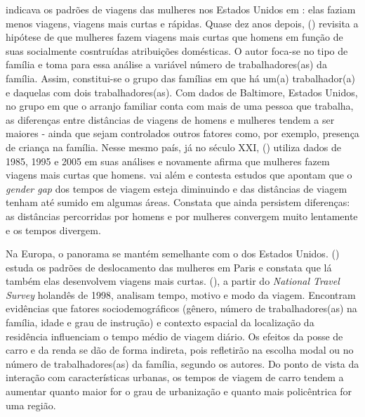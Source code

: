  indicava os padrões de viagens das mulheres nos Estados Unidos em \citeyear{FOX1983}: elas faziam menos viagens, viagens mais curtas e rápidas. Quase dez anos depois,  (\citeyear{IBIPO1992}) revisita a hipótese de que mulheres fazem viagens mais curtas que homens em função de suas socialmente cosntruídas atribuições domésticas. O autor foca-se no tipo de família e toma para essa análise a variável número de trabalhadores(as) da família. Assim, constitui-se o grupo das famílias em que há um(a) trabalhador(a) e daquelas com dois trabalhadores(as). Com dados de Baltimore, Estados Unidos, no grupo em que o arranjo familiar conta com mais de uma pessoa que trabalha, as diferenças entre distâncias de viagens de homens e mulheres tendem a ser maiores - ainda que sejam controlados outros fatores como, por exemplo, presença de criança na família.
Nesse mesmo país, já no século XXI,  (\citeyear{CRANE2007}) utiliza dados de 1985, 1995 e 2005 em suas análises e novamente afirma que mulheres fazem viagens mais curtas que homens.  vai além e contesta estudos que apontam que o \emph{gender gap} dos tempos de viagem esteja diminuindo e das distâncias de viagem tenham até sumido em algumas áreas. Constata que ainda persistem diferenças: as distâncias percorridas por homens e por mulheres convergem muito lentamente e os tempos divergem.

Na Europa, o panorama se mantém semelhante com o dos Estados Unidos.  (\citeyear{FAGNANI1983}) estuda os padrões de deslocamento das mulheres em Paris e constata que lá também elas desenvolvem viagens mais curtas.
 (\citeyear{SCHWANEN2002}), a partir do \emph{National Travel Survey} holandês de 1998, analisam tempo, motivo e modo da viagem. Encontram evidências que fatores sociodemográficos (gênero, número de trabalhadores(as) na família, idade e grau de instrução) e contexto espacial da localização da residência influenciam o tempo médio de viagem diário. Os efeitos da posse de carro e da renda se dão de forma indireta, pois refletirão na escolha modal ou no número de trabalhadores(as) da família, segundo os autores. Do ponto de vista da interação com características urbanas, os tempos de viagem de carro tendem a aumentar quanto maior for o grau de urbanização e quanto mais policêntrica for uma região.

